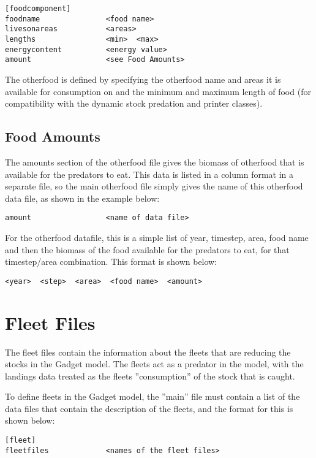 \documentclass[10pt,twoside]{book}
\begin{document}
{\small\begin{verbatim}
[foodcomponent]
foodname               <food name>
livesonareas           <areas>
lengths                <min>  <max>
energycontent          <energy value>
amount                 <see Food Amounts>
\end{verbatim}}

The otherfood is defined by specifying the otherfood name and areas it is available for consumption on and the minimum and maximum length of food (for compatibility with the dynamic stock predation and printer classes).

\section{Food Amounts}\label{sec:foodamounts}
The amounts section of the otherfood file gives the biomass of otherfood that is available for the predators to eat.  This data is listed in a column format in a separate file, so the main otherfood file simply gives the name of this otherfood data file, as shown in the example below:

{\small\begin{verbatim}
amount                 <name of data file>
\end{verbatim}}

For the otherfood datafile, this is a simple list of year, timestep, area, food name and then the biomass of the food available for the predators to eat, for that timestep/area combination.  This format is shown below:

{\small\begin{verbatim}
<year>  <step>  <area>  <food name>  <amount>
\end{verbatim}}

\chapter{Fleet Files}\label{chap:fleet}
The fleet files contain the information about the fleets that are reducing the stocks in the Gadget model.  The fleets act as a predator in the model, with the landings data treated as the fleets ''consumption'' of the stock that is caught.

\bigskip
To define fleets in the Gadget model, the ''main'' file must contain a list of the data files that contain the description of the fleets, and the format for this is shown below:

{\small\begin{verbatim}
[fleet]
fleetfiles             <names of the fleet files>
\end{verbatim}}
\end{document}
